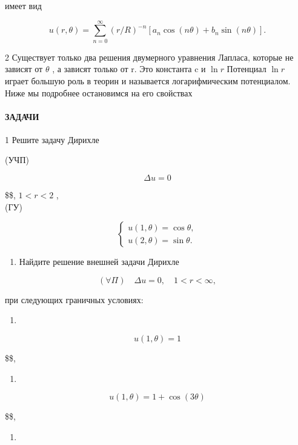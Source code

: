 \documentclass[
  ukrainian,
]{article}
\providecommand{\tightlist}{%
  \setlength{\itemsep}{0pt}\setlength{\parskip}{0pt}}
\begin{document}
имеет вид

\[
u(r, \theta) = \sum_{n=0}^{\infty} (r/R)^{-n} [a_n \cos(n\theta) + b_n \sin(n\theta)].
\]

2 Существует только два решения двумерного уравнения Лапласа, которые не
зависят от \(\theta\) , а зависят только от r. Это константа c и
\(\ln r\) Потенциал \(\ln r\) играет большую роль в теорин и называется
логарифмическим потенциалом. Ниже мы подробнее остановимся на его
свойствах

\paragraph{ЗАДАЧИ}\label{ux437ux430ux434ux430ux447ux438-9}

1 Решите задачу Дирихле

(УЧП)

\[
\Delta u = 0
\]

\$\$, \(1 < r < 2\) ,\\
(ГУ)

\[
\begin{cases} u(1, \theta) = \cos \theta, \\ u(2, \theta) = \sin \theta. \end{cases}
\]

\begin{enumerate}
\def\labelenumi{\arabic{enumi}.}
\setcounter{enumi}{1}
\tightlist
\item
  Найдите решение внешней задачи Дирихле
\end{enumerate}

\[
(\forall \Pi) \quad \Delta u = 0, \quad 1 < r < \infty,
\]

при следующих граничных условиях:

\begin{enumerate}
\def\labelenumi{\alph{enumi})}
\tightlist
\item
\end{enumerate}

\[
u(1, \theta) = 1
\]

\$\$,

\begin{enumerate}
\def\labelenumi{\arabic{enumi})}
\setcounter{enumi}{5}
\tightlist
\item
\end{enumerate}

\[
u(1, \theta) = 1 + \cos(3\theta)
\]

\$\$,

\begin{enumerate}
\def\labelenumi{\Alph{enumi})}
\setcounter{enumi}{1}
\tightlist
\item
\end{enumerate}
\end{document}
